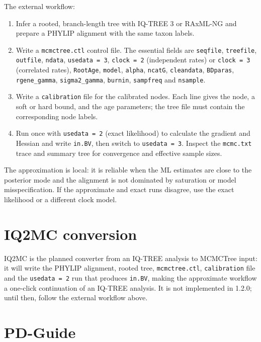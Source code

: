 \documentclass[10pt]{report}
\begin{document}
The external workflow:

\begin{enumerate}
  \item Infer a rooted, branch-length tree with IQ-TREE 3 or RAxML-NG and
        prepare a PHYLIP alignment with the same taxon labels.
  \item Write a \texttt{mcmctree.ctl} control file. The essential fields are
        \texttt{seqfile}, \texttt{treefile}, \texttt{outfile},
        \texttt{ndata}, \texttt{usedata = 3}, \texttt{clock = 2} (independent
        rates) or \texttt{clock = 3} (correlated rates), \texttt{RootAge},
        \texttt{model}, \texttt{alpha}, \texttt{ncatG}, \texttt{cleandata},
        \texttt{BDparas}, \texttt{rgene\_gamma}, \texttt{sigma2\_gamma},
        \texttt{burnin}, \texttt{sampfreq} and \texttt{nsample}.
  \item Write a \texttt{calibration} file for the calibrated nodes. Each line
        gives the node, a soft or hard bound, and the age parameters; the tree
        file must contain the corresponding node labels.
  \item Run once with \texttt{usedata = 2} (exact likelihood) to calculate the
        gradient and Hessian and write \texttt{in.BV}, then switch to
        \texttt{usedata = 3}. Inspect the \texttt{mcmc.txt} trace and summary
        tree for convergence and effective sample sizes.
\end{enumerate}

The approximation is local: it is reliable when the ML estimates are close to
the posterior mode and the alignment is not dominated by saturation or model
misspecification. If the approximate and exact runs disagree, use the exact
likelihood or a different clock model.

\section{IQ2MC conversion}

IQ2MC is the planned converter from an IQ-TREE analysis to MCMCTree input: it
will write the PHYLIP alignment, rooted tree, \texttt{mcmctree.ctl},
\texttt{calibration} file and the \texttt{usedata = 2} run that produces
\texttt{in.BV}, making the approximate workflow a one-click continuation of an
IQ-TREE analysis. It is not implemented in 1.2.0; until then, follow the
external workflow above.

\section{PD-Guide}
\end{document}
